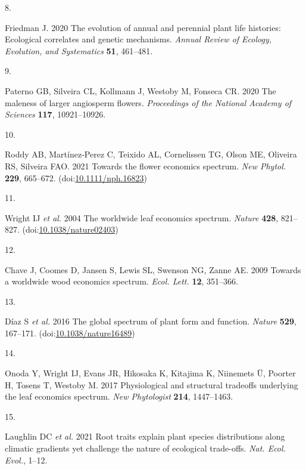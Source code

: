 \documentclass[
  12pt,
  a4paper,
]{article}
\newlength{\cslhangindent}
\newlength{\csllabelwidth}
\newlength{\cslentryspacingunit} %
\newenvironment{CSLReferences}[2] %
 {%
  \setlength{\parindent}{0pt}
  \ifodd #1
  \let\oldpar\par
  \def\par{\hangindent=\cslhangindent\oldpar}
  \fi
  \setlength{\parskip}{#2\cslentryspacingunit}
 }%
 {}
\newcommand{\CSLLeftMargin}[1]{\parbox[t]{\csllabelwidth}{#1}}
\newcommand{\CSLRightInline}[1]{\parbox[t]{\linewidth - \csllabelwidth}{#1}\break}
\begin{document}
\begin{CSLReferences}{0}{0}
\leavevmode{}%
\CSLLeftMargin{8. }
\CSLRightInline{Friedman J. 2020 The evolution of annual and perennial plant life histories: Ecological correlates and genetic mechanisms. \emph{Annual Review of Ecology, Evolution, and Systematics} \textbf{51}, 461--481.}

\leavevmode{}%
\CSLLeftMargin{9. }
\CSLRightInline{Paterno GB, Silveira CL, Kollmann J, Westoby M, Fonseca CR. 2020 The maleness of larger angiosperm flowers. \emph{Proceedings of the National Academy of Sciences} \textbf{117}, 10921--10926.}

\leavevmode{}%
\CSLLeftMargin{10. }
\CSLRightInline{Roddy AB, Martínez-Perez C, Teixido AL, Cornelissen TG, Olson ME, Oliveira RS, Silveira FAO. 2021 Towards the flower economics spectrum. \emph{New Phytol.} \textbf{229}, 665--672. (doi:\href{https://doi.org/10.1111/nph.16823}{10.1111/nph.16823})}

\leavevmode{}%
\CSLLeftMargin{11. }
\CSLRightInline{Wright IJ \emph{et al.} 2004 The worldwide leaf economics spectrum. \emph{Nature} \textbf{428}, 821--827. (doi:\href{https://doi.org/10.1038/nature02403}{10.1038/nature02403})}

\leavevmode{}%
\CSLLeftMargin{12. }
\CSLRightInline{Chave J, Coomes D, Jansen S, Lewis SL, Swenson NG, Zanne AE. 2009 Towards a worldwide wood economics spectrum. \emph{Ecol. Lett.} \textbf{12}, 351--366.}

\leavevmode{}%
\CSLLeftMargin{13. }
\CSLRightInline{Díaz S \emph{et al.} 2016 The global spectrum of plant form and function. \emph{Nature} \textbf{529}, 167--171. (doi:\href{https://doi.org/10.1038/nature16489}{10.1038/nature16489})}

\leavevmode{}%
\CSLLeftMargin{14. }
\CSLRightInline{Onoda Y, Wright IJ, Evans JR, Hikosaka K, Kitajima K, Niinemets Ü, Poorter H, Tosens T, Westoby M. 2017 Physiological and structural tradeoffs underlying the leaf economics spectrum. \emph{New Phytologist} \textbf{214}, 1447--1463.}

\leavevmode{}%
\CSLLeftMargin{15. }
\CSLRightInline{Laughlin DC \emph{et al.} 2021 Root traits explain plant species distributions along climatic gradients yet challenge the nature of ecological trade-offs. \emph{Nat. Ecol. Evol.}, 1--12.}


\end{CSLReferences}
\end{document}

